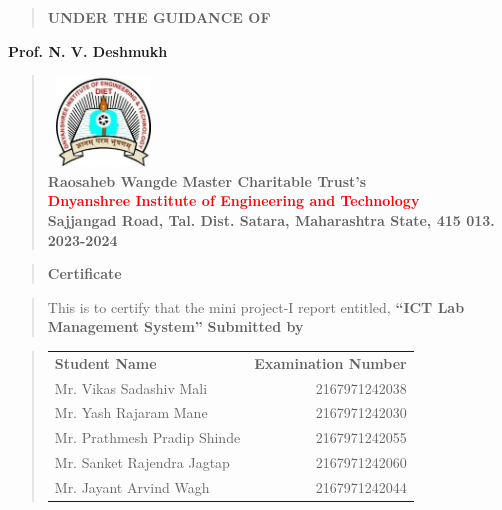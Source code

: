 \documentclass[12pt]{report}
\begin{document}
	\vspace{0.5cm}
	\begin{quote}
		\centering
		\large
		\textbf{UNDER THE GUIDANCE OF}
	\end{quote}
	\textbf{Prof. N. V. Deshmukh}
	\vspace{0.5cm}
	\begin{quote}
		\centering
		\includegraphics[width=1.16667in,height=0.95833in]{media/Logo.png}\\
		\vspace{0.5cm}
		\bfseries
		\textbf{Raosaheb Wangde Master Charitable Trust's}\\
		\textcolor{red}{Dnyanshree Institute of Engineering and Technology}\\
		Sajjangad Road, Tal. Dist. Satara, Maharashtra State, 415 013.\\ 2023-2024
	\end{quote}
	\vspace{0.5cm}
	
	\newpage
	
	
	
	
	\begin{quote}
		\centering
		\LARGE
		\textbf{Certificate}
	\end{quote}
	
	\begin{quote}
		\normalsize
		\centering
		This is to certify that the mini project-I report entitled, \textbf{``ICT Lab Management System''}
		\textbf{Submitted by}\\[1ex]
	\end{quote}
	
	\begin{quote}
		
\begin{table}[ht]
	\centering
	\begin{tabular}{l@{}r}
		\bfseries
		Student Name & \bfseries Examination Number \\[2ex]
		Mr. Vikas Sadashiv Mali & 2167971242038\\[1ex]
		Mr. Yash Rajaram Mane & 2167971242030\\[1ex]
		Mr. Prathmesh Pradip Shinde & 2167971242055\\[1ex]
		Mr. Sanket Rajendra Jagtap & 2167971242060\\[1ex]
		Mr. Jayant Arvind Wagh & 2167971242044\\[1ex]
	\end{tabular}
\end{table}

	\end{quote}
	
\end{document}
